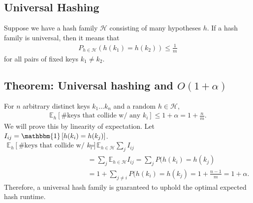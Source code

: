 \documentclass{article}
\begin{document}
\subsection*{Universal Hashing}
Suppose we have a hash family $\mathcal{H}$ consisting of many hypotheses $h$. If a hash family is universal, then it means that
\begin{align*}
    P_{h \in \mathcal{H}} (h(k_1) = h(k_2)) \leq \frac{1}{m}
\end{align*}
for all pairs of fixed keys $k_1 \neq k_2$.
\subsection*{Theorem: Universal hashing and $O(1 + \alpha)$}
For $n$ arbitrary distinct keys $k_1 ... k_n$ and a random $h \in \mathcal{H}$,
\begin{align*}
    \mathbb{E}_h\left[\text{\# keys that collide w/ any } k_i\right] \leq 1 + \alpha = 1 + \frac{n}{m}.
\end{align*}
We will prove this by linearity of expectation. Let $I_{ij} = \mathbbm{1}\left[h(k_i) = h(k_j)\right]$.
\begin{align*}
    \mathbb{E}_h\left[\text{\# keys that collide w/ } k_i\right] &= \mathbb{E}_{h \in \mathcal{H}} \sum_j I_{ij}\\
    &= \sum_j \mathbb{E}_{h \in \mathcal{H}}I_{ij} = \sum_j P(h(k_i) = h(k_j)\\
    &= 1 + \sum_{j \neq i} P(h(k_i) = h(k_j) = 1 + \frac{n-1}{m} = 1 + \alpha.
\end{align*}
Therefore, a universal hash family is guaranteed to uphold the optimal expected hash runtime.
\end{document}
